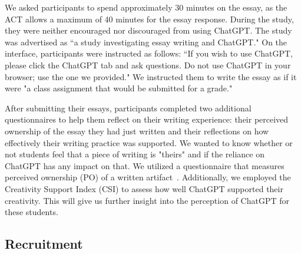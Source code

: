 \documentclass[manuscript,screen,acmsmall]{acmart}
\begin{document}
We asked participants to spend approximately 30 minutes on the essay, as the ACT allows a maximum of 40 minutes for the essay response. During the study, they were neither encouraged nor discouraged from using ChatGPT. The study was advertised as ``a study investigating essay writing and ChatGPT." On the interface, participants were instructed as follows: ``If you wish to use ChatGPT, please click the ChatGPT tab and ask questions. Do not use ChatGPT in your browser; use the one we provided." We instructed them to write the essay as if it were "a class assignment that would be submitted for a grade."


    
After submitting their essays, participants completed two additional questionnaires to help them reflect on their writing experience: their perceived ownership of the essay they had just written and their reflections on how effectively their writing practice was supported. We wanted to know whether or not students feel that a piece of writing is "theirs" and if the reliance on ChatGPT has any impact on that. We utilized a questionnaire that measures perceived ownership (PO) of a written artifact~. Additionally, we employed the Creativity Support Index (CSI) to assess how well ChatGPT supported their creativity. This will give us further insight into the perception of ChatGPT for these students.



\subsection{Recruitment}
\end{document}
